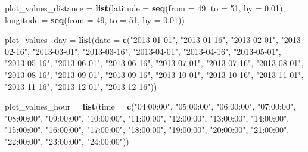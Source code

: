 \documentclass[]{article}
\newenvironment{Shaded}{\begin{snugshade}}{\end{snugshade}}
\newcommand{\KeywordTok}[1]{\textcolor[rgb]{0.13,0.29,0.53}{\textbf{#1}}}
\newcommand{\DataTypeTok}[1]{\textcolor[rgb]{0.13,0.29,0.53}{#1}}
\newcommand{\DecValTok}[1]{\textcolor[rgb]{0.00,0.00,0.81}{#1}}
\newcommand{\FloatTok}[1]{\textcolor[rgb]{0.00,0.00,0.81}{#1}}
\newcommand{\StringTok}[1]{\textcolor[rgb]{0.31,0.60,0.02}{#1}}
\newcommand{\NormalTok}[1]{#1}
\begin{document}
\begin{Shaded}
\begin{Highlighting}[]
{{{{{{\NormalTok{plot_values_distance =}\StringTok{ }\KeywordTok{list}\NormalTok{(}\DataTypeTok{latitude =} \KeywordTok{seq}\NormalTok{(}\DataTypeTok{from =} \DecValTok{49}\NormalTok{, }\DataTypeTok{to =} \DecValTok{51}\NormalTok{, }\DataTypeTok{by =} \FloatTok{0.01}\NormalTok{),}
                            \DataTypeTok{longitude =} \KeywordTok{seq}\NormalTok{(}\DataTypeTok{from =} \DecValTok{49}\NormalTok{, }\DataTypeTok{to =} \DecValTok{51}\NormalTok{, }\DataTypeTok{by =} \FloatTok{0.01}\NormalTok{))}

\NormalTok{plot_values_day =}
\StringTok{  }\KeywordTok{list}\NormalTok{(}\DataTypeTok{date =} \KeywordTok{c}\NormalTok{(}\StringTok{"2013-01-01"}\NormalTok{, }\StringTok{"2013-01-16"}\NormalTok{, }\StringTok{"2013-02-01"}\NormalTok{, }\StringTok{"2013-02-16"}\NormalTok{,}
                \StringTok{"2013-03-01"}\NormalTok{, }\StringTok{"2013-03-16"}\NormalTok{, }\StringTok{"2013-04-01"}\NormalTok{, }\StringTok{"2013-04-16"}\NormalTok{,}
                \StringTok{"2013-05-01"}\NormalTok{, }\StringTok{"2013-05-16"}\NormalTok{, }\StringTok{"2013-06-01"}\NormalTok{, }\StringTok{"2013-06-16"}\NormalTok{,}
                \StringTok{"2013-07-01"}\NormalTok{, }\StringTok{"2013-07-16"}\NormalTok{, }\StringTok{"2013-08-01"}\NormalTok{, }\StringTok{"2013-08-16"}\NormalTok{,}
                \StringTok{"2013-09-01"}\NormalTok{, }\StringTok{"2013-09-16"}\NormalTok{, }\StringTok{"2013-10-01"}\NormalTok{, }\StringTok{"2013-10-16"}\NormalTok{,}
                \StringTok{"2013-11-01"}\NormalTok{, }\StringTok{"2013-11-16"}\NormalTok{, }\StringTok{"2013-12-01"}\NormalTok{, }\StringTok{"2013-12-16"}\NormalTok{))}

\NormalTok{plot_values_hour =}
\StringTok{  }\KeywordTok{list}\NormalTok{(}\DataTypeTok{time =} \KeywordTok{c}\NormalTok{(}\StringTok{"04:00:00"}\NormalTok{, }\StringTok{"05:00:00"}\NormalTok{, }\StringTok{"06:00:00"}\NormalTok{, }\StringTok{"07:00:00"}\NormalTok{,}
                \StringTok{"08:00:00"}\NormalTok{, }\StringTok{"09:00:00"}\NormalTok{, }\StringTok{"10:00:00"}\NormalTok{, }\StringTok{"11:00:00"}\NormalTok{,}
                \StringTok{"12:00:00"}\NormalTok{, }\StringTok{"13:00:00"}\NormalTok{, }\StringTok{"14:00:00"}\NormalTok{, }\StringTok{"15:00:00"}\NormalTok{,}
                \StringTok{"16:00:00"}\NormalTok{, }\StringTok{"17:00:00"}\NormalTok{, }\StringTok{"18:00:00"}\NormalTok{, }\StringTok{"19:00:00"}\NormalTok{,}
                \StringTok{"20:00:00"}\NormalTok{, }\StringTok{"21:00:00"}\NormalTok{, }\StringTok{"22:00:00"}\NormalTok{, }\StringTok{"23:00:00"}\NormalTok{,}
                \StringTok{"24:00:00"}\NormalTok{))}

}}}}}}
\end{Highlighting}
\end{Shaded}
\end{document}

